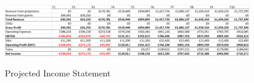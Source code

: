 \documentclass[11pt]{article}		%
\newcommand{\supercite}[1]{\textsuperscript{\cite{#1}}}		%
\begin{document}
			    
			    
			   
			    
			    
			    
		        \begin{table}[H]
					\centering
					\includegraphics[width=0.8\textwidth]{Income_statement_v1}
					\caption{Projected Income Statement}
					\label{forecast_PL}
				\end{table}
		            
\end{document}

